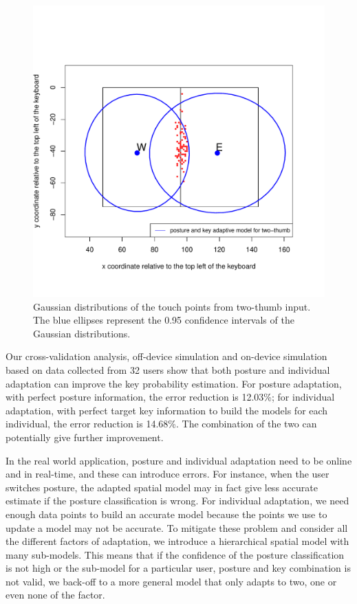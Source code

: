 \documentclass{sigchi}
\begin{document}
\begin{figure}[tb]
 \includegraphics[width=0.9\columnwidth]{figures/ellipses-two-thumb.pdf}
  \caption{Gaussian distributions of the touch points from two-thumb input. The
  blue ellipses represent the 0.95 confidence intervals of the Gaussian
  distributions.}
  \label{fig:e-w-ellipses-1}
\end{figure}

Our cross-validation analysis, off-device simulation and on-device simulation based
on data collected from 32 users show
that both posture and individual adaptation can improve the key probability estimation. For posture 
adaptation, with perfect posture information, the error reduction is 12.03\%; for individual adaptation, with perfect
target key information to build the models for each individual, the error reduction is 14.68\%. The combination of the two 
can potentially give further improvement. 

In the real world application, posture and individual adaptation need to be
online and in real-time, and these can introduce errors. For instance, when the user switches posture,
the adapted spatial model may in fact give less accurate estimate if the posture classification
is wrong. For individual adaptation, we need enough data points to build
an accurate model because the points we use to update a model may not be accurate. 
To mitigate these problem and consider all the different factors of adaptation, we 
introduce a hierarchical spatial model with many sub-models.  
This means that if the confidence of the posture classification is not high or the sub-model for a particular user, posture and key combination is 
not valid, we back-off to a more general model that only adapts to two, one or even none of 
the factor. 
\end{document}
